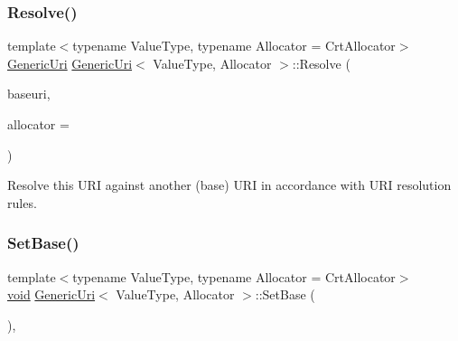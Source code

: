 \mbox{\label{classGenericUri_a7de4b3a28c8046f2293658bc9c0b44e1}} 
\subsubsection{\texorpdfstring{Resolve()}{Resolve()}}
{\footnotesize\ttfamily template$<$typename Value\+Type, typename Allocator = Crt\+Allocator$>$ \\
\hyperlink{classGenericUri}{Generic\+Uri} \hyperlink{classGenericUri}{Generic\+Uri}$<$ Value\+Type, Allocator $>$\+::Resolve (\begin{DoxyParamCaption}\item[{const \hyperlink{classGenericUri}{Generic\+Uri}$<$ Value\+Type, Allocator $>$ \&}]{baseuri,  }\item[{Allocator $\ast$}]{allocator = {} }\end{DoxyParamCaption})\hspace{0.3cm}{\ttfamily [inline]}}



Resolve this U\+RI against another (base) U\+RI in accordance with U\+RI resolution rules. 

\mbox{\label{classGenericUri_ad367483b60312ed435f952ad18da1650}} 
\subsubsection{\texorpdfstring{Set\+Base()}{SetBase()}}
{\footnotesize\ttfamily template$<$typename Value\+Type, typename Allocator = Crt\+Allocator$>$ \\
\hyperlink{imgui__impl__opengl3__loader_8h_ac668e7cffd9e2e9cfee428b9b2f34fa7}{void} \hyperlink{classGenericUri}{Generic\+Uri}$<$ Value\+Type, Allocator $>$\+::Set\+Base (\begin{DoxyParamCaption}{ }\end{DoxyParamCaption})\hspace{0.3cm}{\ttfamily [inline]}, {\ttfamily [private]}}

\mbox{\label{classGenericUri_a23fa250dbf260506ca9137de13a56361}} 
